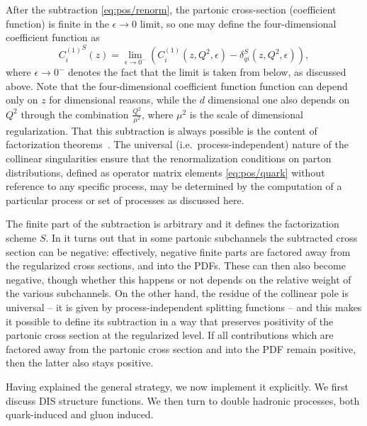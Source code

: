 After the subtraction \cref{eq:pos/renorm}, the partonic cross-section
(coefficient function) is
finite in the $\epsilon\to0$ limit, so one may define the
four-dimensional coefficient function as
\begin{equation}\label{eq:pos/crenorm}
    {C^{(1)}_{i}}^S(z) = \lim_{\epsilon\to0^-}\left( {C^{(1)}_{i}}(z,Q^2,\epsilon)
    -\delta_{qi}^S(z,Q^2,\epsilon)\right),
\end{equation}
where $\epsilon\to 0^-$ denotes the fact that the limit is taken from
below, as discussed above. Note that the four-dimensional coefficient
function function can depend only on $z$ for dimensional reasons,
while the $d$ dimensional one  also depends on $Q^2$ through the
combination $\frac{Q^2}{\mu^2}$, where $\mu^2$ is the scale of
dimensional regularization. That this subtraction is always possible
is the content of factorization
theorems~\cite{Collins:2011zzd,Curci:1980uw}. The universal
(i.e.\ process-independent) nature of the collinear singularities
ensure that the renormalization conditions on parton distributions,
defined as operator matrix elements \cref{eq:pos/quark}
without reference to any specific
process, may be determined by the computation of a particular process
or set of processes as discussed here.

The finite part of the
subtraction is arbitrary and it defines the factorization scheme $S$. In
\msbar{} it turns out that in some partonic subchannels the
subtracted cross section can be negative:
effectively, negative finite parts are factored away from the
regularized cross sections, and into the PDFs. These can then
also become negative, though whether this happens or not depends on
the relative weight of the various subchannels.
On the other hand, the residue of the collinear pole is universal -- it is
given by process-independent splitting functions -- and this makes it possible
to define its subtraction in a way that preserves positivity of the partonic
cross section at the regularized level. 
If all contributions which are factored away from the partonic cross section
and into the PDF remain positive, then the latter also stays positive.


Having explained the general strategy, we now implement it explicitly. 
We first discuss DIS structure functions.
We then turn to double hadronic processes, both quark-induced and gluon
induced.


